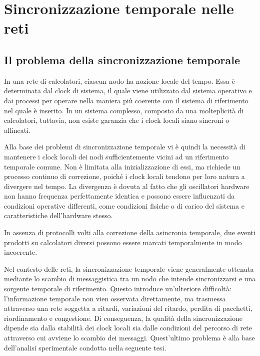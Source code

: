 \chapter{Sincronizzazione temporale nelle reti}
\label{cha:syncTempReti}

\section{Il problema della sincronizzazione temporale}
In una rete di calcolatori, ciascun nodo ha nozione locale del tempo. Essa è
determinata dal clock di sistema, il quale viene utilizzato dal sistema operativo e
dai processi per operare nella maniera più coerente con il sistema di riferimento
nel quale è inserito. In un sistema complesso, composto da una molteplicità di calcolatori,
tuttavia, non esiste garanzia che i clock locali siano sincroni o allineati.

Alla base dei problemi di sincronizzazione temporale vi è quindi la necessità di mantenere
i clock locali dei nodi sufficientemente vicini ad un riferimento temporale comune.
Non è limitata alla inizializzazione di essi, ma richiede un processo continuo
di correzione, poiché i clock locali tendono per loro natura a divergere nel
tempo. La divergenza è dovuta al fatto che gli oscillatori hardware non hanno frequenza
perfettamente identica e possono essere influenzati da condizioni operative differenti,
come condizioni fisiche o di carico del sistema e caratteristiche dell'hardware
stesso. \cite{millsInternetTimeSynchronization,martinNetworkTimeProtocol2010}

In assenza di protocolli volti alla correzione della asincronia temporale, due eventi
prodotti su calcolatori diversi possono essere marcati temporalmente in modo incoerente.

Nel contesto delle reti, la sincronizzazione temporale viene generalmente
ottenuta mediante lo scambio di messaggistica tra un nodo che intende
sincronizzarsi e una sorgente temporale di riferimento. Questo introduce un'ulteriore
difficoltà: l'informazione temporale non vien osservata direttamente, ma trasmessa
attraverso una rete soggetta a ritardi, variazioni del ritardo, perdita di
pacchetti, riordinamento e congestione. Di conseguenza, la qualità della sincronizzazione
dipende sia dalla stabilità dei clock locali sia dalle condizioni del percorso di
rete attraverso cui avviene lo scambio dei messaggi. Quest'ultimo problema è
alla base dell'analisi sperimentale condotta nella seguente tesi.

